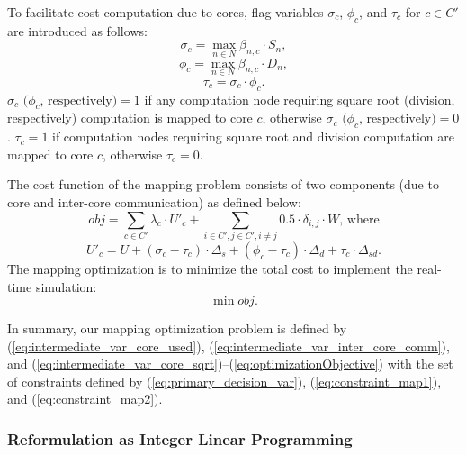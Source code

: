 To facilitate cost computation due to cores, flag variables $\sigma_c$, $\phi_c$, and $\tau_c$ for $c \in C'$ are introduced as follows: 
%
\begin{equation} \label{eq:intermediate_var_core_sqrt}
\sigma_{c}= \max_{n \in N} \beta_{n,c} \cdot S_n,
\end{equation}
%
\begin{equation} \label{eq:intermediate_var_core_division}
\phi_{c}= \max_{n \in N} \beta_{n,c} \cdot D_n,
\end{equation}
%
\begin{equation} \label{eq:intermediate_var_core_sqrt_division}
\tau_{c}= \sigma_c \cdot \phi_c. 
\end{equation}
%
$\sigma_c \text{ ($\phi_c$, respectively)} = 1$ if any computation node requiring square root (division, respectively) computation is mapped to core $c$, otherwise $\sigma_c \text{ ($\phi_c$, respectively)} = 0$. $\tau_c  = 1$ if computation nodes requiring square root and division computation are mapped to core $c$, otherwise $\tau_c = 0$. 

The cost function of the mapping problem consists of two components (due to core and inter-core communication) as defined below:
%
\begin{equation} \label{eq:cost_1}
obj = \sum_{c \in C'}\lambda_c \cdot U'_c + \sum_{i\in C', j \in C', i \ne j} 0.5 \cdot \delta_{i,j} \cdot W \text{, where}
\end{equation}
%
\begin{equation} \label{eq:cost_2}
U'_c = U + (\sigma_c -\tau_c) \cdot \Delta_s + (\phi_c -\tau_c) \cdot \Delta_d + \tau_c \cdot \Delta_{sd}.
\end{equation}
\noindent The mapping optimization is to minimize the total cost to implement the real-time simulation:
\begin{equation} \label{eq:optimizationObjective}
\min obj.
\end{equation}

In summary, our mapping optimization problem is defined by (\ref{eq:intermediate_var_core_used}), (\ref{eq:intermediate_var_inter_core_comm}), and (\ref{eq:intermediate_var_core_sqrt})\nobreakdash--(\ref{eq:optimizationObjective}) with the set of constraints defined by (\ref{eq:primary_decision_var}), (\ref{eq:constraint_map1}), and (\ref{eq:constraint_map2}).

\subsubsection{Reformulation as Integer Linear Programming}

